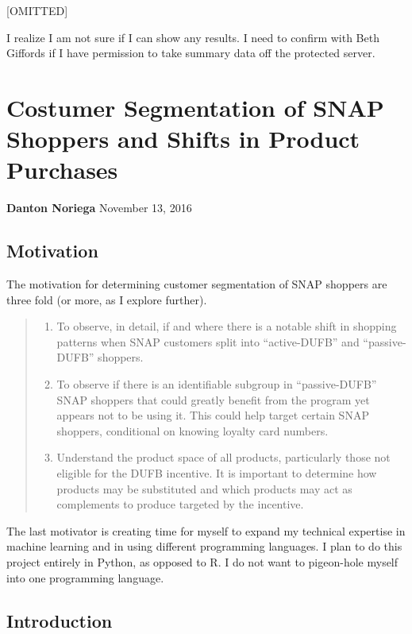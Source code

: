 \documentclass[12pt,letterpaperpaper,]{book}
\providecommand{\tightlist}{%
  \setlength{\itemsep}{0pt}\setlength{\parskip}{0pt}}
\begin{document}
{[}OMITTED{]}

I realize I am not sure if I can show any results. I need to confirm
with Beth Giffords if I have permission to take summary data off the
protected server.

\chapter{Costumer Segmentation of SNAP Shoppers and Shifts in Product
Purchases}\label{costumer-segmentation-of-snap-shoppers-and-shifts-in-product-purchases}

\textbf{Danton Noriega} November 13, 2016

\section*{Motivation}\label{motivation}

The motivation for determining customer segmentation of SNAP shoppers
are three fold (or more, as I explore further).

\begin{quote}
\begin{enumerate}
\def\labelenumi{\arabic{enumi}.}
\tightlist
\item
  To observe, in detail, if and where there is a notable shift in
  shopping patterns when SNAP customers split into ``active-DUFB'' and
  ``passive-DUFB'' shoppers.
\item
  To observe if there is an identifiable subgroup in ``passive-DUFB''
  SNAP shoppers that could greatly benefit from the program yet appears
  not to be using it. This could help target certain SNAP shoppers,
  conditional on knowing loyalty card numbers.
\item
  Understand the product space of all products, particularly those not
  eligible for the DUFB incentive. It is important to determine how
  products may be substituted and which products may act as complements
  to produce targeted by the incentive.
\end{enumerate}
\end{quote}

The last motivator is creating time for myself to expand my technical
expertise in machine learning and in using different programming
languages. I plan to do this project entirely in Python, as opposed to
R. I do not want to pigeon-hole myself into one programming language.

\section*{Introduction}\label{introduction}
\end{document}
